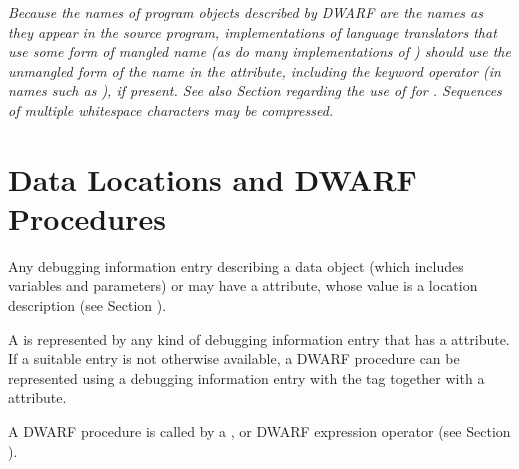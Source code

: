 \textit{Because the names of program objects described by DWARF are 
the names as they appear in the source program, implementations
of language translators that use some form of mangled name
(as do many implementations of ) should use the 
unmangled form of the name in the 
\DWATname{} attribute,
including the keyword operator (in names such as ),
if present. See also 
Section  regarding the use of 
\DWATlinkagename{} for 
.
Sequences of multiple whitespace characters may be compressed.}

\section{Data Locations and DWARF Procedures}
Any debugging information entry describing a data object (which
\hypertarget{chap:DWATlocationdataobjectlocation}{}
includes variables and parameters) or 
may have 
a
\DWATlocation{} attribute,
whose value is a location description
(see Section ).

A 
is represented by any
kind of debugging information entry that has 
a 
\DWATlocation{}
attribute. 
If a suitable entry is not otherwise available,
a DWARF procedure can be represented using a debugging
information entry with the 
tag \DWTAGdwarfprocedureTARG{}
together with 
a \DWATlocation{} attribute.  

A DWARF procedure
is called by a \DWOPcalltwo, 
\DWOPcallfour{} or 
\DWOPcallref{}
DWARF expression operator 
(see Section ).

